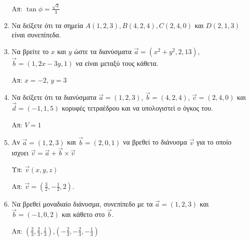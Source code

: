 \begin{enumerate}
		\hfill Απ: $ \tan{\phi} = \frac{\sqrt{3}}{3}  $

	\item Να δείξετε ότι τα σημεία $ A(1,2,3), B(4,2,4), C(2,4,0) $ και $ D(2,1,3) $ είναι συνεπίπεδα.

	\item Να βρείτε το $x$ και $y$ ώστε τα διανύσματα $ \vec{a} = (x^{2}+y^{2},2,13) $, $ \vec{b} = (1,2x-3y,1) $ να είναι μεταξύ τους κάθετα. 

		\hfill Απ: $ x=-2 $, $ y=3 $

	\item Να δείξετε ότι τα διανύσματα $ \vec{a} = (1,2,3) $, $ \vec{b} = (4,2,4) $, $ \vec{c} = (2,4,0) $ και $ \vec{d} = (-1,1,5) $ κορυφές τετραέδρου και να υπολογιστεί ο όγκος του.
		
		\hfill Απ: $ V=1 $

	\item Αν $ \vec{a} = (1,2,3) $ και $ \vec{b} = (2,0,1) $ να βρεθεί το διάνυσμα $ \vec{v}$ για το
		οποίο ισχυει $ \vec{v} = \vec{a} + \vec{b} \times \vec{v} $ 

		\hfill Υπ: $ \vec{v} (x,y,z) $

		\hfill Απ: $ \vec{v} = (\frac{3}{2}, - \frac{1}{2}, 2) $.

	\item Να βρεθεί μοναδιαίο διάνυσμα, συνεπίπεδο με τα $ \vec{a} = (1,2,3) $ και $ \vec{b} =
		(-1,0,2) $ και κάθετο στο $ \vec{b} $.


		\hfill Απ: $ (\frac{2}{3}, \frac{2}{3}, \frac{1}{3}) $,$ (-\frac{2}{3},- \frac{2}{3}, -\frac{1}{3})$  
\end{enumerate}


